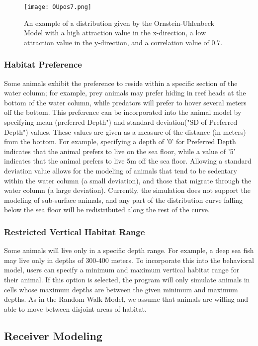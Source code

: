 \begin{figure}[h]
	\label{OUimg}
	\centering
	\texttt{[image: OUpos7.png]}
	\caption{An example of a distribution given by the Ornstein-Uhlenbeck Model with a high attraction value in the x-direction, a low attraction value in the y-direction, and a correlation value of 0.7.}
\end{figure}


\subsubsection{Habitat Preference}
\label{habitatPref}
Some animals exhibit the preference to reside within a specific section of the water column; for example, prey animals may prefer hiding in reef heads at the bottom of the water column, while predators will prefer to hover several meters off the bottom.  This preference can be incorporated into the animal model by specifying mean (preferred Depth") and standard deviation("SD of Preferred Depth") values.  These values are given as a measure of the distance (in meters) from the bottom.  For example, specifying a depth of '0' for Preferred Depth indicates that the animal prefers to live on the sea floor, while a value of '5' indicates that the animal prefers to live 5m off the sea floor.  Allowing a standard deviation value allows for the modeling of animals that tend to be sedentary within the water column (a small deviation), and those that migrate through the water column (a large deviation).  Currently, the simulation does not support the modeling of sub-surface animals, and any part of the distribution curve falling below the sea floor will be redistributed along the rest of the curve. 


\subsubsection{Restricted Vertical Habitat Range}
\label{restrictedVerticalHabitat}
Some animals will live only in a specific depth range.  For example, a deep sea fish may live only in depths of 300-400 meters.  To incorporate this into the behavioral model, users can specify a minimum and maximum vertical habitat range for their animal.  If this option is selected, the program will only simulate animals in cells whose maximum depths are between the given minimum and maximum depths.  As in the Random Walk Model, we assume that animals are willing and able to move between disjoint areas of habitat.


\subsection{Receiver Modeling}
\label{receiverModel}

